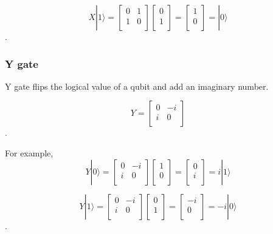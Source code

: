 \begin{equation}
 X|1\rangle = \begin{bmatrix}
0 & 1 \\
1 & 0 \\
\end{bmatrix} 
\left[
\begin{array}{c}
0 \\
1  \\
\end{array}
\right]
= \left[
\begin{array}{c}
1 \\
0 \\
\end{array}
\right]
= |0\rangle
\end{equation}.

\subsubsection{Y gate}

Y gate flips the logical value of a qubit and add an imaginary number.

\begin{equation}
 Y = \begin{bmatrix}
0 & -i \\
i & 0 \\
\end{bmatrix}
\end{equation}.

For example,
\begin{equation}
Y|0\rangle = \begin{bmatrix}
0 & -i \\
i & 0 \\
\end{bmatrix} 
\left[
\begin{array}{c}
1 \\
0 \\
\end{array}
\right]
= \left[
\begin{array}{c}
0 \\
i \\
\end{array}
\right]
= i|1\rangle
\end{equation}

\begin{equation}
Y|1\rangle = \begin{bmatrix}
0 & -i \\
i & 0 \\
\end{bmatrix} 
\left[
\begin{array}{c}
0 \\
1  \\
\end{array}
\right]
= \left[
\begin{array}{c}
-i \\
0 \\
\end{array}
\right]
= -i|0\rangle
\end{equation}.

